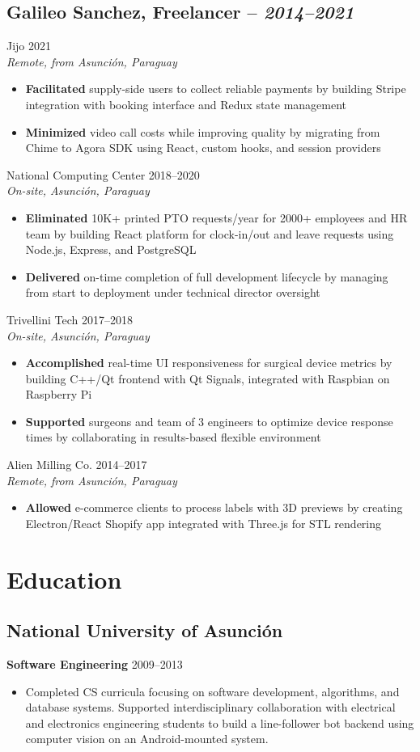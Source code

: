 \documentclass[11pt,a4paper]{article}
\newcommand{\actionverb}[1]{\textcolor{actioncolor}{\textbf{#1}}}
\newcommand{\cvcompany}[3]{
  \subsection{#1 \textcolor{mediumgray}{#2}}
  #3
}
\newcommand{\cvrole}[4]{
  \large{#1} \hfill \textcolor{mediumgray}{\small #2}\\
  \normalsize\textit{#3}
  \begin{itemize}
    #4
  \end{itemize}
  \vspace{1em}
}
\newcommand{\cveducation}[4]{
  \subsection{#1}
  \textbf{#2} \hfill \textcolor{mediumgray}{\small #3}
  \begin{itemize}
    \item #4
  \end{itemize}
}
\begin{document}
\cvcompany{Galileo Sanchez, Freelancer}{-- \textit{2014--2021}}{
  \cvrole{Jijo}{2021}{Remote, from Asunción, Paraguay}{
    \item \actionverb{Facilitated} supply-side users to collect reliable payments by building Stripe integration with booking interface and Redux state management
    \item \actionverb{Minimized} video call costs while improving quality by migrating from Chime to Agora SDK using React, custom hooks, and session providers
  }
  
  \cvrole{National Computing Center}{2018--2020}{On-site, Asunción, Paraguay}{
    \item \actionverb{Eliminated} 10K+ printed PTO requests/year for 2000+ employees and HR team  by building React platform for clock-in/out and leave requests using Node.js, Express, and PostgreSQL
    \item \actionverb{Delivered} on-time completion of full development lifecycle by managing from start to deployment under technical director oversight
  }
  
  \cvrole{Trivellini Tech}{2017--2018}{On-site, Asunción, Paraguay}{
    \item \actionverb{Accomplished} real-time UI responsiveness for surgical device metrics by building C++/Qt frontend with Qt Signals, integrated with Raspbian on Raspberry Pi
    \item \actionverb{Supported} surgeons and team of 3 engineers to optimize device response times by collaborating in results-based flexible environment
  }
  
  \cvrole{Alien Milling Co.}{2014--2017}{Remote, from Asunción, Paraguay}{
    \item \actionverb{Allowed} e-commerce clients to process labels with 3D previews by creating Electron/React Shopify app integrated with Three.js for STL rendering
  }
}

\section{Education}

\cveducation{National University of Asunción}{Software Engineering}{2009--2013}{Completed CS curricula focusing on software development, algorithms, and database systems. Supported interdisciplinary collaboration with electrical and electronics engineering students to build a line-follower bot backend using computer vision on an Android-mounted system.}
\end{document}
